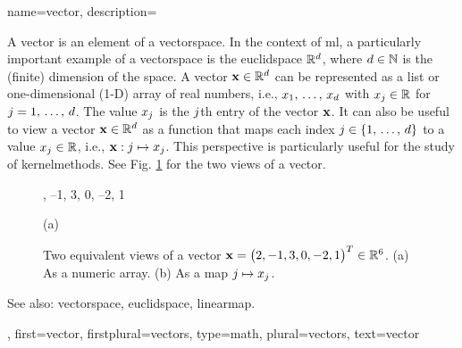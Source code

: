 {name={vector},
	description={A vector is an element of a \gls{vectorspace}. 
		In the context of \gls{ml}, a particularly important example of a \gls{vectorspace} 
		is the \gls{euclidspace} $\mathbb{R}^{d}$, where $d \in \mathbb{N}$ 
		is the (finite) dimension of the space. A vector ${\bf x} \in \mathbb{R}^{d}$ 
		can be represented as a list or one-dimensional (1-D) array of real numbers, i.e., 
		$x_1, \,\ldots, \,x_{d}$ with $x_j \in \mathbb{R}$ for 
		$j = 1, \,\ldots, \,d$. The value $x_j$ is the $j$th 
		entry of the vector ${\bf x}$. It can also be useful to view a vector ${\bf x} \in \mathbb{R}^{d}$ 
		as a \gls{function} that maps each index $j \in \{1, \,\ldots, \,d\}$ 
		to a value $x_j \in \mathbb{R}$, i.e., ${\bf x}: j \mapsto x_j$. 
		This perspective is particularly useful for the study of \glspl{kernelmethod}. See Fig. 
		\ref{fig:vector-function-dual_dict} for the two views of a vector.
		\begin{figure}[H]
			\begin{minipage}[c]{0.48\textwidth}
				, --1, 3, 0, --2, 1
				\begin{minipage}{\textwidth}
				\vspace{5ex}
				\centering
				{\selectfont (a)}
				\end{minipage}
			\end{minipage}
			\hfill
			\begin{minipage}{0.48\textwidth}
			\centering
			\end{minipage}
			\caption{Two equivalent views of a vector ${\bf x}= \big( 2, -1, 3, 0, -2, 1 \big)^{T} \in \mathbb{R}^{6}$.
			(a) As a numeric array. (b) As a \gls{map} $j \mapsto x_j$.}
			\label{fig:vector-function-dual_dict}
		\end{figure}
		See also: \gls{vectorspace}, \gls{euclidspace}, \gls{linearmap}.},
	first={vector},
	firstplural={vectors},
	type=math,
	plural={vectors},
	text={vector}
}


